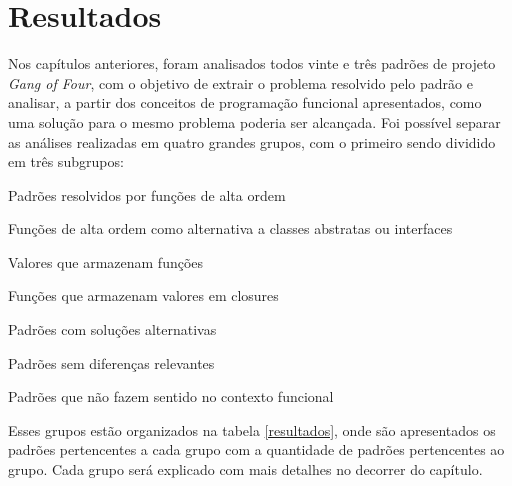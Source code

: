 \chapter{Resultados}

Nos capítulos anteriores, foram analisados todos 
vinte e três padrões de projeto \textit{Gang of 
Four}, com o objetivo de extrair o problema 
resolvido pelo padrão e analisar, a partir dos 
conceitos de programação funcional apresentados, 
como uma solução para o mesmo problema poderia ser 
alcançada. Foi possível separar as análises realizadas em 
quatro grandes grupos, com o primeiro sendo 
dividido em três subgrupos: 

\begin{alineas}
    \item Padrões resolvidos por funções de alta ordem
    \begin{alineas}
        \item Funções de alta ordem como alternativa a classes abstratas ou interfaces
        \item Valores que armazenam funções
        \item Funções que armazenam valores em closures
    \end{alineas}
    \item Padrões com soluções alternativas
    \item Padrões sem diferenças relevantes
    \item Padrões que não fazem sentido no contexto funcional
\end{alineas}

Esses grupos estão organizados na tabela 
\ref{resultados}, onde são apresentados os 
padrões pertencentes a cada grupo com a 
quantidade de padrões pertencentes ao grupo. 
Cada grupo será explicado com mais detalhes 
no decorrer do capítulo.

